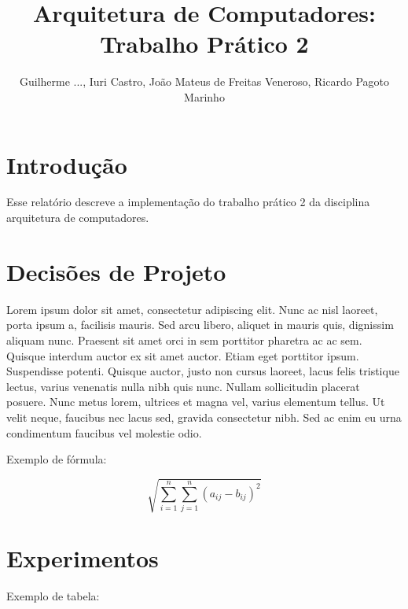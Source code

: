 \documentclass{article}
\begin{document}
\title{Arquitetura de Computadores: Trabalho Prático 2}
\author{Guilherme ..., Iuri Castro, João Mateus de Freitas Veneroso, Ricardo Pagoto Marinho}

\maketitle

\section{Introdução}

Esse relatório descreve a implementação do trabalho prático 2 da disciplina arquitetura de computadores. 

\section{Decisões de Projeto}

Lorem ipsum dolor sit amet, consectetur adipiscing elit. Nunc ac nisl laoreet, porta ipsum a, facilisis mauris. Sed arcu libero, aliquet in mauris quis, dignissim aliquam nunc. Praesent sit amet orci in sem porttitor pharetra ac ac sem. Quisque interdum auctor ex sit amet auctor. Etiam eget porttitor ipsum. Suspendisse potenti. Quisque auctor, justo non cursus laoreet, lacus felis tristique lectus, varius venenatis nulla nibh quis nunc. Nullam sollicitudin placerat posuere. Nunc metus lorem, ultrices et magna vel, varius elementum tellus. Ut velit neque, faucibus nec lacus sed, gravida consectetur nibh. Sed ac enim eu urna condimentum faucibus vel molestie odio.

Exemplo de fórmula:

\[
\sqrt{\sum_{i = 1}^n\sum_{j = 1}^n (a_{ij} - b_{ij})^2}
\]

\section{Experimentos}

Exemplo de tabela:
\end{document}
